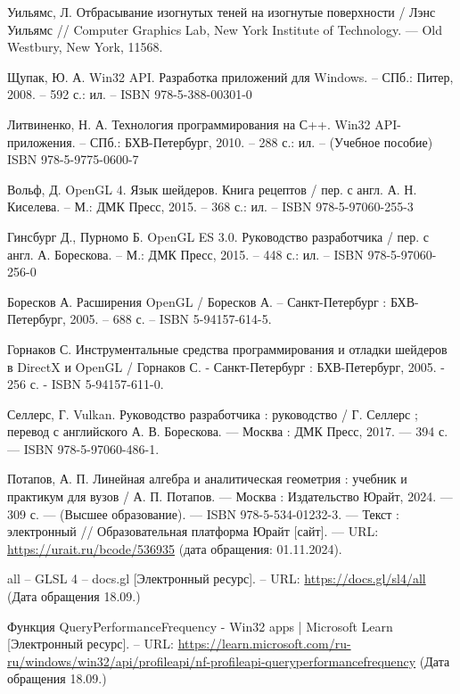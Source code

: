\renewcommand\bibname{СПИСОК ИСПОЛЬЗОВАННЫХ \hbox{ИСТОЧНИКОВ}}

\begin{thebibliography}{}

    Уильямс, Л. Отбрасывание изогнутых теней на изогнутые поверхности /
    Лэнс Уильямс // Computer Graphics Lab, New York Institute of Technology.
    — Old Westbury, New York, 11568.

    Щупак, Ю. А.
    Win32 API. Разработка приложений для Windows.
    -- СПб.: Питер, 2008. -- 592 с.: ил. -- ISBN 978-5-388-00301-0

    Литвиненко, Н. А.
    Технология программирования на С++. Win32 API-приложения.
    -- СПб.: БХВ-Петербург, 2010. -- 288 с.: ил. -- (Учебное пособие) ISBN 978-5-9775-0600-7

    Вольф, Д.
    OpenGL 4. Язык шейдеров. Книга рецептов / пер. с англ. А. Н. Киселева.
    -- М.: ДМК Пресс, 2015. – 368 с.: ил. -- ISBN 978-5-97060-255-3

    Гинсбург Д., Пурномо Б.
    OpenGL ES 3.0. Руководство разработчика / пер. с англ. А. Борескова.
    -- М.: ДМК Пресс, 2015. – 448 с.: ил. -- ISBN 978-5-97060-256-0

    Боресков А.
    Расширения OpenGL / Боресков А. -- Санкт-Петербург :
    БХВ-Петербург, 2005. -- 688 с.
    -- ISBN 5-94157-614-5.

    Горнаков С.
    Инструментальные средства программирования и отладки шейдеров в DirectX и OpenGL /
    Горнаков С. - Санкт-Петербург : БХВ-Петербург, 2005. - 256 с. - ISBN 5-94157-611-0.

    Селлерс, Г.
    Vulkan. Руководство разработчика : руководство /
    Г. Селлерс ; перевод с английского А. В. Борескова. — Москва :
    ДМК Пресс, 2017. — 394 с. — ISBN 978-5-97060-486-1. 

    Потапов, А. П.  Линейная алгебра и аналитическая геометрия :
    учебник и практикум для вузов / А. П. Потапов. — Москва :
    Издательство Юрайт, 2024. — 309 с. — (Высшее образование).
    — ISBN 978-5-534-01232-3. — Текст :
    электронный // Образовательная платформа Юрайт [сайт].
    — URL: \url{https://urait.ru/bcode/536935} (дата обращения: 01.11.2024).

    all -- GLSL 4 -- docs.gl [Электронный ресурс].
    -- URL: \url{https://docs.gl/sl4/all}
    (Дата обращения 18.09.\the\year)

    Функция QueryPerformanceFrequency - Win32 apps | Microsoft Learn [Электронный ресурс].
    -- URL: \url{https://learn.microsoft.com/ru-ru/windows/win32/api/profileapi/nf-profileapi-queryperformancefrequency}
    (Дата обращения 18.09.\the\year)

\end{thebibliography}
